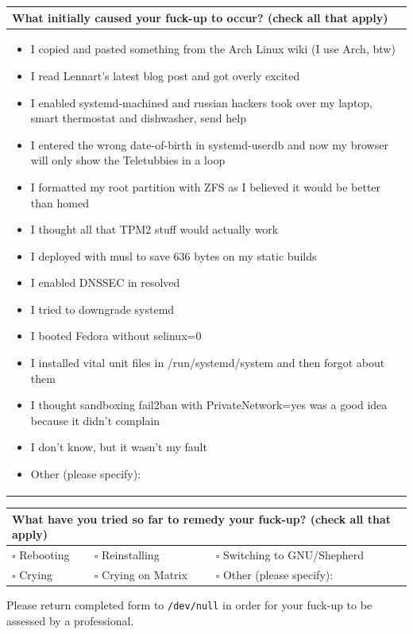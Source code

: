 \documentclass[letterpaper]{article}
\begin{document}
\begin{tabularx}{\textwidth}{|X|}
\hline
\textbf{What initially caused your fuck-up to occur?} (check all that apply) \\ \hline
\begin{minipage}{\linewidth}
\vspace{0.5em}
\begin{itemize}[label={\(\square\)},nosep,leftmargin=*]
    \item I copied and pasted something from the Arch Linux wiki (I use Arch, btw)
    \item I read Lennart's latest blog post and got overly excited
    \item I enabled systemd-machined and russian hackers took over my laptop, smart thermostat and dishwasher, send help
    \item I entered the wrong date-of-birth in systemd-userdb and now my browser will only show the Teletubbies in a loop
    \item I formatted my root partition with ZFS as I believed it would be better than homed
    \item I thought all that TPM2 stuff would actually work
    \item I deployed with musl to save 636 bytes on my static builds
    \item I enabled DNSSEC in resolved
    \item I tried to downgrade systemd
    \item I booted Fedora without selinux=0
    \item I installed vital unit files in /run/systemd/system and then forgot about them
    \item I thought sandboxing fail2ban with PrivateNetwork=yes was a good idea because it didn't complain
    \item I don't know, but it wasn't my fault
    \item Other (please specify): \dotfill
\end{itemize}
\vspace{0.5em}
\end{minipage} \\ \hline
\end{tabularx}

\vspace{0.5em}

\begin{tabularx}{\textwidth}{|lllX|}
\hline
\multicolumn{4}{|l|}{\textbf{What have you tried so far to remedy your fuck-up?} (check all that apply)} \\ \hline
\(\square\) Rebooting &
\(\square\) Reinstalling &
\(\square\) Switching to GNU/Shepherd \\

\(\square\) Crying &
\(\square\) Crying on Matrix &
\multicolumn{2}{l|}{\(\square\) Other (please specify): \dotfill} \\ \hline
\end{tabularx}

\vspace*{\fill}
\begin{center}
Please return completed form to \texttt{/dev/null} in order for your fuck-up to be assessed by a professional.
\end{center}
\end{document}
